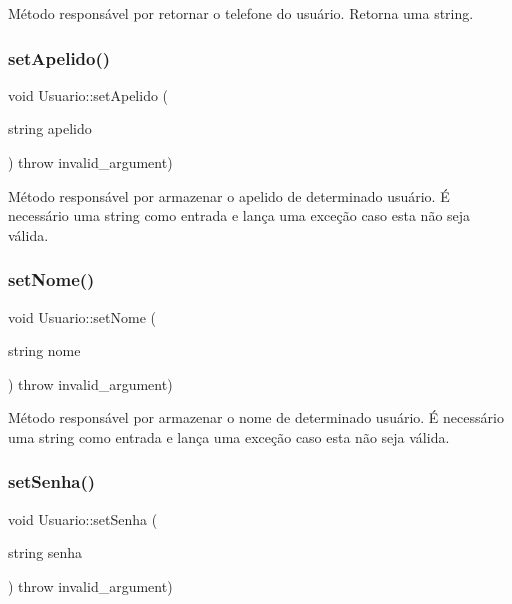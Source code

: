 Método responsável por retornar o telefone do usuário. Retorna uma string. \mbox{\label{classUsuario_a1da1c9170ba41c06b9adea159d21c092}} 
\subsubsection{\texorpdfstring{set\+Apelido()}{setApelido()}}
{\footnotesize\ttfamily void Usuario\+::set\+Apelido (\begin{DoxyParamCaption}\item[{string}]{apelido }\end{DoxyParamCaption}) throw  invalid\+\_\+argument) }

Método responsável por armazenar o apelido de determinado usuário. É necessário uma string como entrada e lança uma exceção caso esta não seja válida. \mbox{\label{classUsuario_a0d002d4ceff9c827457269a24a3e6c24}} 
\subsubsection{\texorpdfstring{set\+Nome()}{setNome()}}
{\footnotesize\ttfamily void Usuario\+::set\+Nome (\begin{DoxyParamCaption}\item[{string}]{nome }\end{DoxyParamCaption}) throw  invalid\+\_\+argument) }

Método responsável por armazenar o nome de determinado usuário. É necessário uma string como entrada e lança uma exceção caso esta não seja válida. \mbox{\label{classUsuario_a428675e3b6d3743e05b1297cca1dee42}} 
\subsubsection{\texorpdfstring{set\+Senha()}{setSenha()}}
{\footnotesize\ttfamily void Usuario\+::set\+Senha (\begin{DoxyParamCaption}\item[{string}]{senha }\end{DoxyParamCaption}) throw  invalid\+\_\+argument) }

